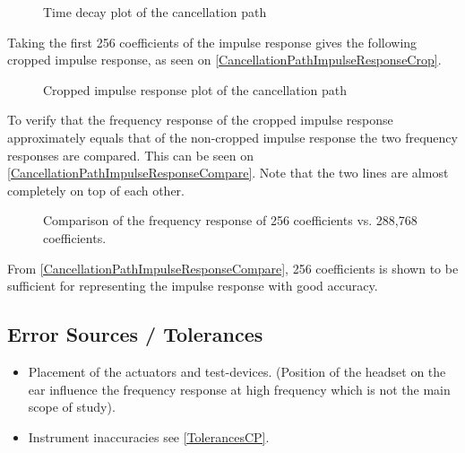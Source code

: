 
\begin{figure}[H]
	\centering
	
	\caption{Time decay plot of the cancellation path}
	\label{TimeDecayPlotCancellationPath}
\end{figure}

Taking the first 256 coefficients of the impulse response gives the following cropped impulse response, as seen on \autoref{CancellationPathImpulseResponseCrop}.

\begin{figure}[H]
	\centering
	
	\caption{Cropped impulse response plot of the cancellation path}
	\label{CancellationPathImpulseResponseCrop}
\end{figure}

To verify that the frequency response of the cropped impulse response approximately equals that of the non-cropped impulse response the two frequency responses are compared. This can be seen on \autoref{CancellationPathImpulseResponseCompare}. Note that the two lines are almost completely on top of each other.

\begin{figure}[H]
	\centering
	
	\caption{Comparison of the frequency response of 256 coefficients vs. 288,768 coefficients.}
	\label{CancellationPathImpulseResponseCompare}
\end{figure}

From \autoref{CancellationPathImpulseResponseCompare}, 256 coefficients is shown to be sufficient for representing the impulse response with good accuracy. 

\subsection{Error Sources / Tolerances}
\begin{itemize}
	\item Placement of the actuators and test-devices. (Position of the headset on the ear  influence the frequency response at high frequency which is not the main scope of study).
	\item Instrument inaccuracies see \autoref{TolerancesCP}.
\end{itemize}


